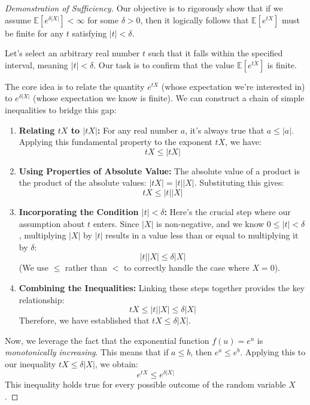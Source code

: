 \documentclass[12pt, letterpaper]{article}
\newcommand{\E}{\mathbb{E}} %
\begin{document}
\begin{proof}[Demonstration of Sufficiency]
Our objective is to rigorously show that if we assume $\E[e^{\delta|X|}] < \infty$ for some $\delta > 0$, then it logically follows that $\E[e^{tX}]$ must be finite for any $t$ satisfying $|t| < \delta$.

Let's select an arbitrary real number $t$ such that it falls within the specified interval, meaning $|t| < \delta$. Our task is to confirm that the value $\E[e^{tX}]$ is finite.

The core idea is to relate the quantity $e^{tX}$ (whose expectation we're interested in) to $e^{\delta|X|}$ (whose expectation we know is finite). We can construct a chain of simple inequalities to bridge this gap:

\begin{enumerate}
    \item \textbf{Relating $tX$ to $|tX|$:} For any real number $a$, it's always true that $a \le |a|$. Applying this fundamental property to the exponent $tX$, we have:
    \[ tX \le |tX| \]

    \item \textbf{Using Properties of Absolute Value:} The absolute value of a product is the product of the absolute values: $|tX| = |t| |X|$. Substituting this gives:
    \[ tX \le |t| |X| \]

    \item \textbf{Incorporating the Condition $|t| < \delta$:} Here's the crucial step where our assumption about $t$ enters. Since $|X|$ is non-negative, and we know $0 \le |t| < \delta$, multiplying $|X|$ by $|t|$ results in a value less than or equal to multiplying it by $\delta$:
    \[ |t| |X| \le \delta |X| \]
    (We use $\le$ rather than $<$ to correctly handle the case where $X=0$).

    \item \textbf{Combining the Inequalities:} Linking these steps together provides the key relationship:
    \[ tX \le |t| |X| \le \delta |X| \]
    Therefore, we have established that $tX \le \delta|X|$.
\end{enumerate}

Now, we leverage the fact that the exponential function $f(u) = e^u$ is \emph{monotonically increasing}. This means that if $a \le b$, then $e^a \le e^b$. Applying this to our inequality $tX \le \delta|X|$, we obtain:
\[ e^{tX} \le e^{\delta|X|} \]
This inequality holds true for every possible outcome of the random variable $X$.


\end{proof}
\end{document}
